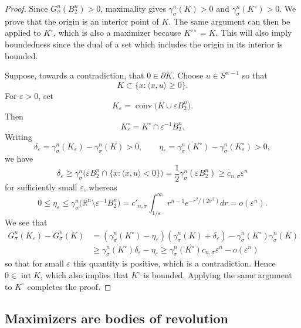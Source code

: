 \documentclass[12pt,oneside,reqno]{amsart}
\numberwithin{equation}{section}
\theoremstyle{remark}
\newcommand{\eps}{\varepsilon}
\begin{document}
\begin{proof}
Since $G^n_\sigma(B_2^n)>0$, maximality gives
$\gamma_\sigma^n(K)>0$ and $\gamma_\sigma^n(K^\circ)>0$.
We prove that the origin is an interior point of $K$.  The same argument can
then be applied to $K^\circ$, which is also a maximizer because
$K^{\circ\circ}=K$. This will also imply boundedness since the dual of a set which includes the origin in its interior is bounded. 

Suppose, towards a contradiction, that $0\in\partial K$.  Choose $u\in S^{n-1}$ so that
\[
 K\subset\{x:\langle x,u\rangle\geq 0\}.
\]
For $\varepsilon>0$, set
\[
 K_\varepsilon
 =\overline{\operatorname{conv}}\bigl(K\cup\varepsilon B_2^n\bigr).
\]
Then
\[
 K_\varepsilon^\circ
 =K^\circ\cap\varepsilon^{-1}B_2^n.
\]
Writing
\[
 \delta_\varepsilon
 =\gamma_\sigma^n(K_\varepsilon)-\gamma_\sigma^n(K)>0,
 \qquad
 \eta_\varepsilon
 =\gamma_\sigma^n(K^\circ)-\gamma_\sigma^n(K_\varepsilon^\circ)>0,
\]
we have
\[
 \delta_\varepsilon
 \geq \gamma_\sigma^n\bigl(\varepsilon B_2^n
       \cap\{x:\langle x,u\rangle<0\}\bigr)
 =\frac12\gamma_\sigma^n(\varepsilon B_2^n)
 \geq c_{n,\sigma}\varepsilon^n
\]
for sufficiently small $\varepsilon$, whereas
\[
 0\leq\eta_\varepsilon
 \leq\gamma_\sigma^n\bigl(\mathbb R^n\setminus
       \varepsilon^{-1}B_2^n\bigr)
 =c'_{n,\sigma}\int_{1/\varepsilon}^{\infty}
r^{n-1}e^{-r^2/(2\sigma^2)} dr = o(\varepsilon^n).
\]
We see that 
\[
 \begin{aligned}
 G^n_\sigma(K_\varepsilon)-G^n_\sigma(K) %
 & = 
  (\gamma_\sigma^n(K^\circ)-\eta_\eps)(\gamma_\sigma^n(K)+\delta_\eps) - 
\gamma_\sigma^n(K^\circ)\gamma_\sigma^n(K)\\
 &\ge \gamma_\sigma^n(K^\circ)\delta_\varepsilon-%
 \eta_\varepsilon \geq \gamma_\sigma^n(K^\circ)c_{n,\sigma}\varepsilon^n-o(\varepsilon^n)
 \end{aligned}
\]
so that for small $\varepsilon$ this quantity is positive, which is a contradiction.  Hence $0\in\operatorname{int}K$, which also implies that $K^\circ$ is bounded. Applying the same argument to $K^\circ$ completes the proof. 
\end{proof}


\subsection{Maximizers are bodies of revolution}\label{sec:symmetrization}
\end{document}
